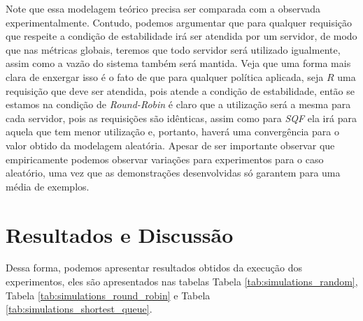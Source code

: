 \documentclass[conference]{IEEEtran}
\begin{document}
Note que essa modelagem teórico precisa ser comparada com a observada experimentalmente. Contudo, podemos argumentar que para qualquer requisição que respeite a condição de estabilidade irá ser atendida por um servidor, de modo que nas métricas globais, teremos que todo servidor será utilizado igualmente, assim como a vazão do sistema também será mantida. Veja que uma forma mais clara de enxergar isso é o fato de que para qualquer política aplicada, seja $R$ uma requisição que deve ser atendida, pois atende a condição de estabilidade, então se estamos na condição de \textit{Round-Robin} é claro que a utilização será a mesma para cada servidor, pois as requisições são idênticas, assim como para \textit{SQF} ela irá para aquela que tem menor utilização e, portanto, haverá uma convergência para o valor obtido da modelagem aleatória. Apesar de ser importante observar que empiricamente podemos observar variações para experimentos para o caso aleatório, uma vez que as demonstrações desenvolvidas só garantem para uma média de exemplos.

\noindent  

\section{Resultados e Discussão}

Dessa forma, podemos apresentar resultados obtidos da execução dos experimentos, eles são apresentados nas tabelas Tabela \ref{tab:simulations_random}, Tabela \ref{tab:simulations_round_robin} e Tabela \ref{tab:simulations_shortest_queue}. 

\end{document}
